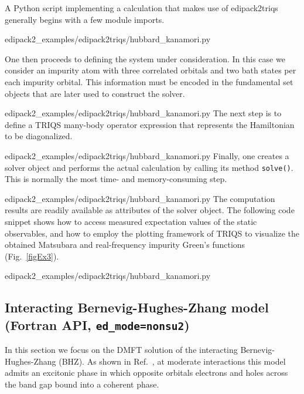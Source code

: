 \documentclass[edipack_sp.tex]{subfiles}
\begin{document}
\fixme{}


A Python script implementing a calculation that makes use of edipack2triqs
generally begins with a few module imports.

{edipack2_examples/edipack2triqs/hubbard_kanamori.py}

One then proceeds to defining the system under consideration. In this case we
consider an impurity atom with three correlated orbitals and two bath states
per each impurity orbital. This information must be encoded in the fundamental
set objects that are later used to construct the solver.

{edipack2_examples/edipack2triqs/hubbard_kanamori.py}
The next step is to define a TRIQS many-body operator expression that represents
the Hamiltonian to be diagonalized.

{edipack2_examples/edipack2triqs/hubbard_kanamori.py}
Finally, one creates a solver object and performs the actual calculation by
calling its method {\tt solve()}. This is normally the most time- and
memory-consuming step.

{edipack2_examples/edipack2triqs/hubbard_kanamori.py}
The computation results are readily available as attributes of the solver
object. The following code snippet shows how to access measured expectation
values of the static observables, and how to employ the plotting framework of
TRIQS to visualize the obtained Matsubara and real-frequency impurity Green's
functions (Fig.~\ref{figEx3}).

{edipack2_examples/edipack2triqs/hubbard_kanamori.py}














\subsection{Interacting Bernevig-Hughes-Zhang model (Fortran API, {\tt ed\_mode=nonsu2})}
In this section we focus on the DMFT solution of the interacting
Bernevig-Hughes-Zhang (BHZ).
As shown in Ref.~, at moderate
interactions this model admits an excitonic phase in which opposite
orbitals electrons and holes across the band gap bound into a coherent phase.
\end{document}
